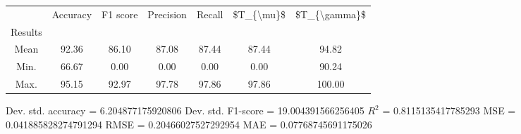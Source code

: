 \begin{tabular}{|c|c|c|c|c|c|c|}
\toprule
{} &  Accuracy &  F1 score &  Precision &  Recall &  \$T\_\{\textbackslash mu\}\$ &  \$T\_\{\textbackslash gamma\}\$ \\
Results &           &           &            &         &            &               \\
\hline
Mean    &     92.36 &     86.10 &      87.08 &   87.44 &      87.44 &         94.82 \\
Min.    &     66.67 &      0.00 &       0.00 &    0.00 &       0.00 &         90.24 \\
Max.    &     95.15 &     92.97 &      97.78 &   97.86 &      97.86 &        100.00 \\
\bottomrule
\end{tabular}

 Dev. std. accuracy = 6.204877175920806
 Dev. std. F1-score = 19.004391566256405
 $R^2$ = 0.8115135417785293
 MSE = 0.041885828274791294
 RMSE = 0.20466027527292954
 MAE = 0.07768745691175026